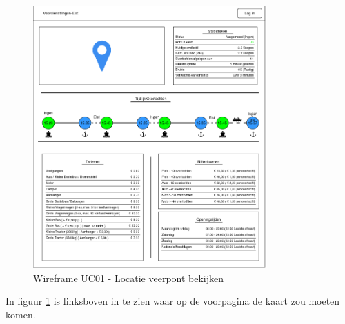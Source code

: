\documentclass{article}
\begin{document}
\begin{figure}[H]
    \centering
    \includegraphics[width=0.8\textwidth]{images/wireframe_startpagina.png}
    \caption{Wireframe UC01 - Locatie veerpont bekijken}
    \label{fig:wf1}
\end{figure}
In figuur \ref{fig:wf1} is linksboven in te zien waar op de voorpagina de kaart zou moeten komen.
\end{document}
